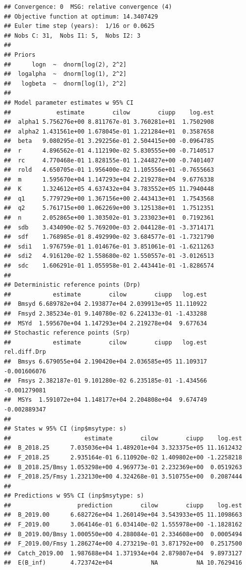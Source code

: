 \documentclass[
]{article}
\begin{document}
\begin{verbatim}
## Convergence: 0  MSG: relative convergence (4)
## Objective function at optimum: 14.3407429
## Euler time step (years):  1/16 or 0.0625
## Nobs C: 31,  Nobs I1: 5,  Nobs I2: 3
## 
## Priors
##      logn  ~  dnorm[log(2), 2^2]
##  logalpha  ~  dnorm[log(1), 2^2]
##   logbeta  ~  dnorm[log(1), 2^2]
## 
## Model parameter estimates w 95% CI 
##             estimate        cilow        ciupp    log.est  
##  alpha1 5.756276e+00 8.811767e-01 3.760281e+01  1.7502908  
##  alpha2 1.431561e+00 1.678045e-01 1.221284e+01  0.3587658  
##  beta   9.080295e-01 3.292256e-01 2.504415e+00 -0.0964785  
##  r      4.896562e-01 4.112190e-02 5.830555e+00 -0.7140517  
##  rc     4.770468e-01 1.828155e-01 1.244827e+00 -0.7401407  
##  rold   4.650705e-01 1.956400e-02 1.105556e+01 -0.7655663  
##  m      1.595670e+04 1.147293e+04 2.219278e+04  9.6776338  
##  K      1.324612e+05 4.637432e+04 3.783552e+05 11.7940448  
##  q1     5.779729e+00 1.367156e+00 2.443413e+01  1.7543568  
##  q2     5.761715e+00 1.062269e+00 3.125138e+01  1.7512351  
##  n      2.052865e+00 1.303502e-01 3.233023e+01  0.7192361  
##  sdb    3.434090e-02 5.769200e-03 2.044128e-01 -3.3714171  
##  sdf    1.768985e-01 8.492990e-02 3.684577e-01 -1.7321790  
##  sdi1   1.976759e-01 1.014676e-01 3.851061e-01 -1.6211263  
##  sdi2   4.916120e-02 1.558680e-02 1.550557e-01 -3.0126513  
##  sdc    1.606291e-01 1.055958e-01 2.443441e-01 -1.8286574  
##  
## Deterministic reference points (Drp)
##            estimate        cilow        ciupp   log.est  
##  Bmsyd 6.689782e+04 2.193877e+04 2.039913e+05 11.110922  
##  Fmsyd 2.385234e-01 9.140780e-02 6.224133e-01 -1.433288  
##  MSYd  1.595670e+04 1.147293e+04 2.219278e+04  9.677634  
## Stochastic reference points (Srp)
##            estimate        cilow        ciupp   log.est rel.diff.Drp  
##  Bmsys 6.679055e+04 2.190420e+04 2.036585e+05 11.109317 -0.001606076  
##  Fmsys 2.382187e-01 9.101280e-02 6.235185e-01 -1.434566 -0.001279081  
##  MSYs  1.591072e+04 1.148177e+04 2.204808e+04  9.674749 -0.002889347  
## 
## States w 95% CI (inp$msytype: s)
##                     estimate        cilow        ciupp    log.est  
##  B_2018.25      7.035036e+04 1.489201e+04 3.323375e+05 11.1612432  
##  F_2018.25      2.935164e-01 6.110920e-02 1.409802e+00 -1.2258218  
##  B_2018.25/Bmsy 1.053298e+00 4.969773e-01 2.232369e+00  0.0519263  
##  F_2018.25/Fmsy 1.232130e+00 4.324268e-01 3.510755e+00  0.2087444  
## 
## Predictions w 95% CI (inp$msytype: s)
##                   prediction        cilow        ciupp    log.est  
##  B_2019.00      6.682726e+04 1.260149e+04 3.543933e+05 11.1098663  
##  F_2019.00      3.064146e-01 6.034140e-02 1.555978e+00 -1.1828162  
##  B_2019.00/Bmsy 1.000550e+00 4.288084e-01 2.334608e+00  0.0005494  
##  F_2019.00/Fmsy 1.286274e+00 4.273219e-01 3.871792e+00  0.2517500  
##  Catch_2019.00  1.987688e+04 1.371934e+04 2.879807e+04  9.8973127  
##  E(B_inf)       4.723742e+04           NA           NA 10.7629416
\end{verbatim}
\end{document}
